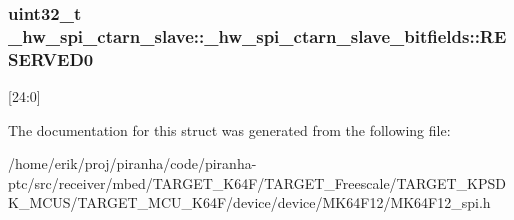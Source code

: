 \subsubsection[{\texorpdfstring{R\+E\+S\+E\+R\+V\+E\+D0}{RESERVED0}}]{\setlength{\rightskip}{0pt plus 5cm}uint32\+\_\+t \+\_\+hw\+\_\+spi\+\_\+ctarn\+\_\+slave\+::\+\_\+hw\+\_\+spi\+\_\+ctarn\+\_\+slave\+\_\+bitfields\+::\+R\+E\+S\+E\+R\+V\+E\+D0}\hypertarget{struct__hw__spi__ctarn__slave_1_1__hw__spi__ctarn__slave__bitfields_ac500b054ab4a6a870db292c219b1c20f}{}\label{struct__hw__spi__ctarn__slave_1_1__hw__spi__ctarn__slave__bitfields_ac500b054ab4a6a870db292c219b1c20f}
\mbox{[}24\+:0\mbox{]} 

The documentation for this struct was generated from the following file\+:\begin{DoxyCompactItemize}
\item 
/home/erik/proj/piranha/code/piranha-\/ptc/src/receiver/mbed/\+T\+A\+R\+G\+E\+T\+\_\+\+K64\+F/\+T\+A\+R\+G\+E\+T\+\_\+\+Freescale/\+T\+A\+R\+G\+E\+T\+\_\+\+K\+P\+S\+D\+K\+\_\+\+M\+C\+U\+S/\+T\+A\+R\+G\+E\+T\+\_\+\+M\+C\+U\+\_\+\+K64\+F/device/device/\+M\+K64\+F12/M\+K64\+F12\+\_\+spi.\+h\end{DoxyCompactItemize}
